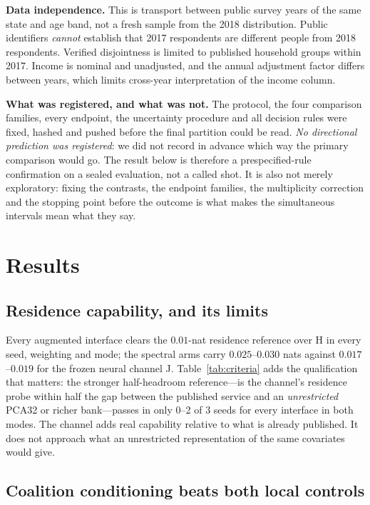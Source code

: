\documentclass[10pt]{article}
\begin{document}
\textbf{Data independence.} This is transport between public survey years of the same state and age
band, not a fresh sample from the 2018 distribution. Public identifiers \emph{cannot} establish that
2017 respondents are different people from 2018 respondents. Verified disjointness is limited to
published household groups within 2017. Income is nominal and unadjusted, and the annual adjustment
factor differs between years, which limits cross-year interpretation of the income column.

\textbf{What was registered, and what was not.} The protocol, the four comparison families, every
endpoint, the uncertainty procedure and all decision rules were fixed, hashed and pushed before the
final partition could be read. \emph{No directional prediction was registered}: we did not record in
advance which way the primary comparison would go. The result below is therefore a prespecified-rule
confirmation on a sealed evaluation, not a called shot. It is also not merely exploratory: fixing the
contrasts, the endpoint families, the multiplicity correction and the stopping point before the
outcome is what makes the simultaneous intervals mean what they say.

\section{Results}
\label{sec:results}

\subsection{Residence capability, and its limits}

Every augmented interface clears the $0.01$-nat residence reference over H in every seed, weighting
and mode; the spectral arms carry $0.025$--$0.030$ nats against $0.017$--$0.019$ for the frozen
neural channel J. Table~\ref{tab:criteria} adds the qualification that matters: the stronger
half-headroom reference---is the channel's residence probe within half the gap between the published
service and an \emph{unrestricted} PCA32 or richer bank---passes in only 0--2 of 3 seeds for every
interface in both modes. The channel adds real capability relative to what is already published. It
does not approach what an unrestricted representation of the same covariates would give.

\subsection{Coalition conditioning beats both local controls}
\end{document}
